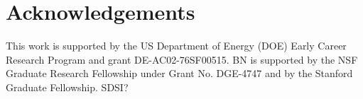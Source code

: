 \section{Acknowledgements} %
\label{sec:acknowledgements}

This work is supported by the US Department of Energy (DOE) Early Career Research Program and grant DE-AC02-76SF00515. BN is supported by the NSF Graduate Research Fellowship under Grant No. DGE-4747 and by the Stanford Graduate Fellowship.  SDSI?

